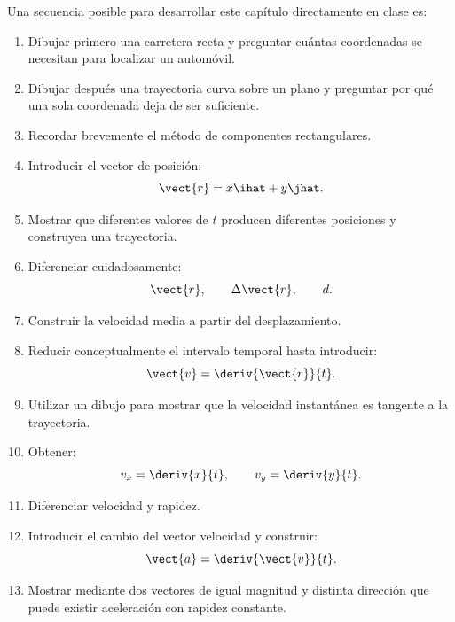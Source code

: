 \begin{notapedagogica}
Una secuencia posible para desarrollar este capítulo directamente en clase es:

\begin{enumerate}
    \item Dibujar primero una carretera recta y preguntar cuántas coordenadas se
    necesitan para localizar un automóvil.

    \item Dibujar después una trayectoria curva sobre un plano y preguntar por qué
    una sola coordenada deja de ser suficiente.

    \item Recordar brevemente el método de componentes rectangulares.

    \item Introducir el vector de posición:
    \[
    \vect{r}=x\ihat+y\jhat.
    \]

    \item Mostrar que diferentes valores de \(t\) producen diferentes posiciones y
    construyen una trayectoria.

    \item Diferenciar cuidadosamente:
    \[
    \vect{r},
    \qquad
    \Delta\vect{r},
    \qquad
    d.
    \]

    \item Construir la velocidad media a partir del desplazamiento.

    \item Reducir conceptualmente el intervalo temporal hasta introducir:
    \[
    \vect{v}=\deriv{\vect{r}}{t}.
    \]

    \item Utilizar un dibujo para mostrar que la velocidad instantánea es tangente
    a la trayectoria.

    \item Obtener:
    \[
    v_x=\deriv{x}{t},
    \qquad
    v_y=\deriv{y}{t}.
    \]

    \item Diferenciar velocidad y rapidez.

    \item Introducir el cambio del vector velocidad y construir:
    \[
    \vect{a}=\deriv{\vect{v}}{t}.
    \]

    \item Mostrar mediante dos vectores de igual magnitud y distinta dirección que
    puede existir aceleración con rapidez constante.


\end{enumerate}
\end{notapedagogica}
